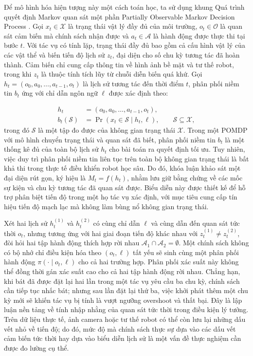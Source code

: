 Để mô hình hóa hiện tượng này một cách toán học, ta sử dụng khung Quá trình quyết định Markov quan sát một phần Partially Observable Markov Decision Process \cite{pomdp1998}. Gọi $x_t \in \mathcal X$ là trạng thái vật lý đầy đủ của môi trường, $o_t \in \mathcal O$ là quan sát cảm biến mà chính sách nhận được và $a_t \in \mathcal A$ là hành động được thực thi tại bước $t$. Với tác vụ có tính lặp, trạng thái đầy đủ bao gồm cả cấu hình vật lý của các vật thể và biến tiến độ lịch sử $z_t$, đại diện cho số chu kỳ tương tác đã hoàn thành. Cảm biến chỉ cung cấp thông tin về hình ảnh bề mặt và tư thế robot, trong khi $z_t$ là thuộc tính tích lũy từ chuỗi diễn biến quá khứ. Gọi $h_t = (o_0, a_0, \ldots, a_{t-1}, o_t)$ là lịch sử tương tác đến thời điểm $t$, phân phối niềm tin $b_t$ ứng với chỉ dẫn ngôn ngữ $\ell$ được xác định theo:

\begin{equation}
\begin{aligned}
h_t &= (o_0,a_0,\ldots,a_{t-1},o_t),\\
b_t(\mathcal S) &= \Pr(x_t\in \mathcal S\mid h_t,\ell),\qquad \mathcal S\subseteq\mathcal X,
\end{aligned}
\end{equation}
trong đó $\mathcal S$ là một tập đo được của không gian trạng thái $\mathcal X$. Trong một POMDP với mô hình chuyển trạng thái và quan sát đã biết, phân phối niềm tin $b_t$ là một thống kê đủ của toàn bộ lịch sử $h_t$ cho bài toán ra quyết định tối ưu. Tuy nhiên, việc duy trì phân phối niềm tin liên tục trên toàn bộ không gian trạng thái là bất khả thi trong thực tế điều khiển robot học sâu. Do đó, khóa luận khảo sát một đại diện rút gọn, ký hiệu là $M_t = f(h_t)$, nhằm lưu giữ bằng chứng về các mốc sự kiện và chu kỳ tương tác đã quan sát được. Biểu diễn này được thiết kế để hỗ trợ phân biệt tiến độ trong một họ tác vụ xác định, với mục tiêu cung cấp tín hiệu tiến độ mạch lạc mà không làm bùng nổ không gian trạng thái.

Xét hai lịch sử $h_t^{(1)}$ và $h_t^{(2)}$ có cùng chỉ dẫn $\ell$ và cùng dẫn đến quan sát tức thời $o_t$, nhưng tương ứng với hai giai đoạn tiến độ khác nhau với $z_t^{(1)} \neq z_t^{(2)}$, đòi hỏi hai tập hành động thích hợp rời nhau $\mathcal A_1 \cap \mathcal A_2 = \emptyset$. Một chính sách không có bộ nhớ chỉ điều kiện hóa theo $(o_t, \ell)$ tất yếu sẽ sinh cùng một phân phối hành động $\pi(\cdot \mid o_t, \ell)$ cho cả hai trường hợp. Phân phối xác suất này không thể đồng thời gán xác suất cao cho cả hai tập hành động rời nhau. Chẳng hạn, khi bát đã được đặt lại hai lần trong một tác vụ yêu cầu ba chu kỳ, chính sách cần tiếp tục nhấc bát; nhưng sau lần đặt lại thứ ba, việc khởi phát thêm một chu kỳ mới sẽ khiến tác vụ bị tính là vượt ngưỡng overshoot và thất bại. Đây là lập luận nền tảng về tính nhập nhằng của quan sát tức thời trong điều kiện lý tưởng. Trên dữ liệu thực tế, ảnh camera hoặc tư thế robot có thể còn lưu lại những dấu vết nhỏ về tiến độ; do đó, mức độ mà chính sách thực sự dựa vào các dấu vết cảm biến tức thời hay dựa vào biểu diễn lịch sử là một vấn đề thực nghiệm cần được đo lường cụ thể.

